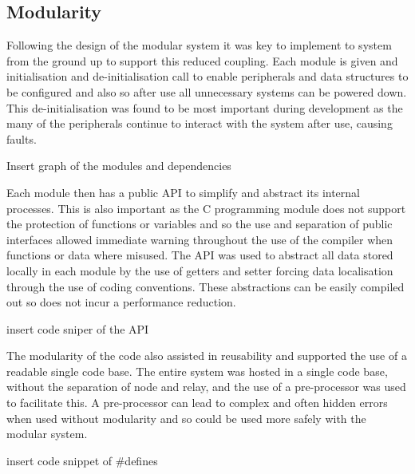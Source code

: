 \subsection{Modularity}
Following the design of the modular system it was key to implement to system from the ground up
to support this reduced coupling. Each module is given and initialisation and de-initialisation call to
enable peripherals and data structures to be configured and also so after use all unnecessary
systems can be powered down. This de-initialisation was found to be most important during
development as the many of the peripherals continue to interact with the system after use, causing
faults.


{Insert graph of the modules and dependencies}


Each module then has a public \ac{API} to simplify and abstract its internal processes. This is also
important as the C programming module does not support the protection of functions or variables
and so the use and separation of public interfaces allowed immediate warning throughout the use of
the compiler when functions or data where misused. The \ac{API} was used to abstract all data stored
locally in each module by the use of getters and setter forcing data localisation through the use of
coding conventions. These abstractions can be easily compiled out so does not incur a performance
reduction.


{insert code sniper of the API}


The modularity of the code also assisted in reusability and supported the use of a readable single
code base. The entire system was hosted in a single code base, without the separation of node and
relay, and the use of a pre-processor was used to facilitate this. A pre-processor can lead to complex
and often hidden errors when used without modularity and so could be used more safely with the
modular system.


{insert code snippet of \#defines}


